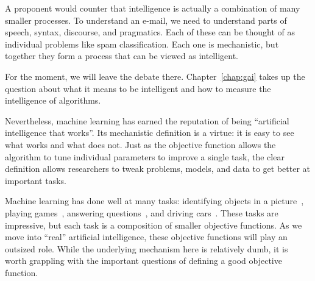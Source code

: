 
A proponent would counter that intelligence is actually a combination
of many smaller processes.  To understand an e-mail, we need to
understand parts of speech, syntax, discourse, and pragmatics.  Each
of these can be thought of as individual problems like spam
classification.  Each one is mechanistic, but together they form a
process that can be viewed as intelligent.

For the moment, we will leave the debate there.
Chapter~\ref{chap:gai} takes up the question about what it means to be
intelligent and how to measure the intelligence of algorithms.


Nevertheless, machine learning has earned the reputation of being
``artificial intelligence that works''.  Its mechanistic definition is
a virtue: it is easy to see what works and what does not.  Just as the
objective function allows the algorithm to tune individual parameters
to improve a single task, the clear definition allows researchers to
tweak problems, models, and data to get better at important tasks.


Machine learning has done well at many tasks: identifying objects in
a picture~\citep{russakovsky-15}, playing
games~\citep{vinyals2017starcraft}, answering
questions~\citep{ferruci-10}, and driving cars~\citep{thrun-10}.
%
These tasks are impressive, but each task is a composition of smaller objective
functions.
%
As we move into ``real'' artificial intelligence, these objective
functions will play an outsized role.
%
While the underlying mechanism here is relatively dumb, it is worth
grappling with the important questions of defining a good objective
function.

\subsection{}

